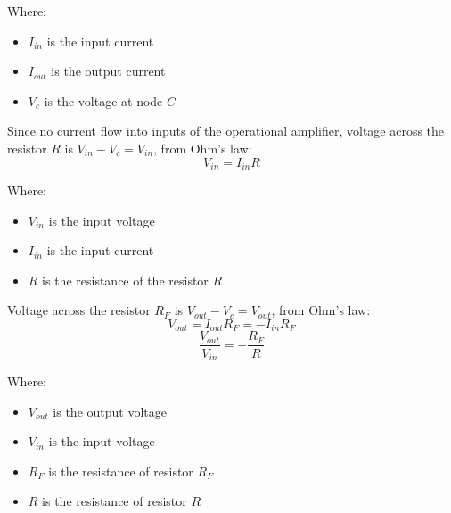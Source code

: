 \documentclass[11pt]{article}
\begin{document}
Where:
\begin{itemize}
\item \(I_{in}\) is the input current
\item \(I_{out}\) is the output current
\item \(V_c\) is the voltage at node \(C\)
\end{itemize}

Since no current flow into inputs of the operational amplifier, voltage across the resistor \(R\) is \(V_{in} - V_c = V_{in}\), from Ohm's law:
\[V_{in} = I_{in} R\]

Where:
\begin{itemize}
\item \(V_{in}\) is the input voltage
\item \(I_{in}\) is the input current
\item \(R\) is the resistance of the resistor \(R\)
\end{itemize}

Voltage across the resistor \(R_F\) is \(V_{out} - V_c = V_{out}\), from Ohm's law:
\[V_{out} = I_{out} R_F = - I_{in} R_F\]
\[\frac{V_{out}}{V_{in}} = - \frac{R_F}{R}\]

Where:
\begin{itemize}
\item \(V_{out}\) is the output voltage
\item \(V_{in}\) is the input voltage
\item \(R_F\) is the resistance of resistor \(R_F\)
\item \(R\) is the resistance of resistor \(R\)
\end{itemize}
\end{document}
